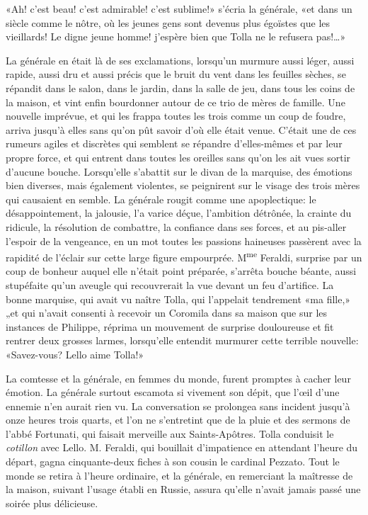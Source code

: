 «Ah! c'est beau! c'est admirable! c'est sublime!» s'écria la
générale, «et dans un siècle comme le nôtre, où les jeunes gens sont
devenus plus égoïstes que les vieillards! Le digne jeune homme! j'espère
bien que Tolla ne le refusera pas!\ldots»

La générale en était là de ses exclamations, lorsqu'un murmure aussi
léger, aussi rapide, aussi dru et aussi précis que le bruit du vent dans
les feuilles sèches, se répandit dans le salon, dans le jardin, dans la
salle de jeu, dans tous les coins de la maison, et vint enfin bourdonner
autour de ce trio de mères de famille. Une nouvelle imprévue, et qui les
frappa toutes les trois comme un coup de foudre, arriva jusqu'à elles
sans qu'on pût savoir d'où elle était venue. C'était une de ces rumeurs
agiles et discrètes qui semblent se répandre d'elles-mêmes et par leur
propre force, et qui entrent dans toutes les oreilles sans qu'on les ait
vues sortir d'aucune bouche. Lorsqu'elle s'abattit sur le divan de la
marquise, des émotions bien diverses, mais également violentes, se
peignirent sur le visage des trois mères qui causaient en semble. La
générale rougit comme une apoplectique: le désappointement, la jalousie,
l'a varice déçue, l'ambition détrônée, la crainte du ridicule, la
résolution de combattre, la confiance dans ses forces, et au pis-aller
l'espoir de la vengeance, en un mot toutes les passions haineuses
passèrent avec la rapidité de l'éclair sur cette large figure
empourprée. M\textsuperscript{me} Feraldi, surprise par un coup de
bonheur auquel elle n'était point préparée, s'arrêta bouche béante,
aussi stupéfaite qu'un aveugle qui recouvrerait la vue devant un feu
d'artifice. La bonne marquise, qui avait vu naître Tolla, qui l'appelait
tendrement «ma fille,» „et qui n'avait consenti à recevoir un Coromila
dans sa maison que sur les instances de Philippe, réprima un mouvement
de surprise douloureuse et fit rentrer deux grosses larmes, lorsqu'elle
entendit murmurer cette terrible nouvelle: «Savez-vous? Lello aime
Tolla!»

La comtesse et la générale, en femmes du monde, furent promptes à cacher
leur émotion. La générale surtout escamota si vivement son dépit, que
l'œil d'une ennemie n'en aurait rien vu. La conversation se prolongea
sans incident jusqu'à onze heures trois quarts, et l'on ne s'entretint
que de la pluie et des sermons de l'abbé Fortunati, qui faisait
merveille aux Saints-Apôtres. Tolla conduisit le \emph{cotillon} avec
Lello. M. Feraldi, qui bouillait d'impatience en attendant l'heure du
départ, gagna cinquante-deux fiches à son cousin le cardinal Pezzato.
Tout le monde se retira à l'heure ordinaire, et la générale, en
remerciant la maîtresse de la maison, suivant l'usage établi en Russie,
assura qu'elle n'avait jamais passé une soirée plus délicieuse.

